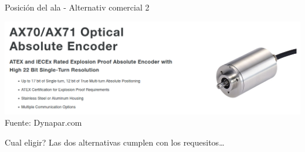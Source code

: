 \documentclass[presentation,aspectratio=169]{beamer}
\begin{document}
\begin{frame}[label={sec:orgee1c643}]{Posición del ala - Alternativ comercial 2}
\begin{center}
\includegraphics[width=0.99\linewidth]{../../figures/dynapar-absolute-encoder.png}\\
{\footnotesize Fuente: Dynapar.com}
\end{center}
\end{frame}


\begin{frame}[label={sec:orgbeae2fb}]{Cual eligir?}
Las dos alternativas cumplen con los requesitos\ldots{}
\end{frame}
\end{document}
